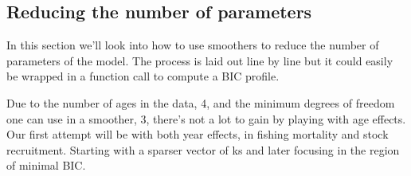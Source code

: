 \documentclass[a4paper,english,11pt]{article}\usepackage[]{graphicx}\usepackage[]{xcolor}
\begin{document}
\subsection{Reducing the number of parameters}

In this section we'll look into how to use smoothers to reduce the number of parameters of the model. The process is laid out line by line but it could easily be wrapped in a function call to compute a BIC profile.

Due to the number of ages in the data, 4, and the minimum degrees of freedom one can use in a  smoother, 3, there's not a lot to gain by playing with age effects. Our first attempt will be with both year effects, in fishing mortality and stock recruitment. Starting with a sparser vector of ks and later focusing in the region of minimal BIC.  
\end{document}
